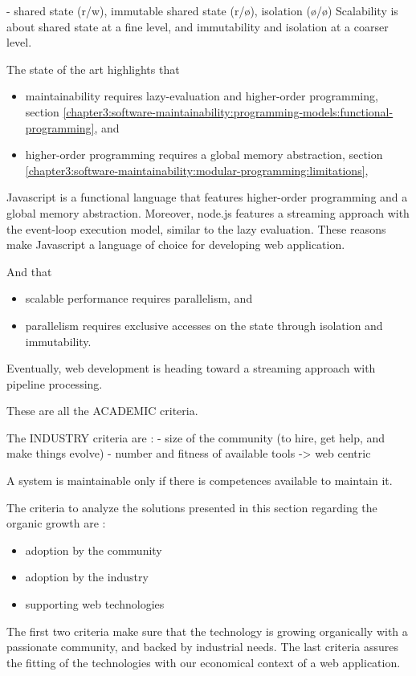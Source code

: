 - shared state (r/w), immutable shared state (r/ø), isolation (ø/ø)
Scalability is about shared state at a fine level, and immutability and isolation at a coarser level.


The state of the art highlights that
\begin{itemize}
\item maintainability requires lazy-evaluation and higher-order programming, section \ref{chapter3:software-maintainability:programming-models:functional-programming}, and
\item higher-order programming requires a global memory abstraction, section \ref{chapter3:software-maintainability:modular-programming:limitations},
\end{itemize}
Javascript is a functional language that features higher-order programming and a global memory abstraction.
Moreover, node.js features a streaming approach with the event-loop execution model, similar to the lazy evaluation.
These reasons make Javascript a language of choice for developing web application.

And that
\begin{itemize}
\item scalable performance requires parallelism, and
\item parallelism requires exclusive accesses on the state through isolation and immutability.
\end{itemize}
Eventually, web development is heading toward a streaming approach with pipeline processing.




These are all the ACADEMIC criteria.

The INDUSTRY criteria are :
- size of the community (to hire, get help, and make things evolve)
- number and fitness of available tools
  ->  web centric


A system is maintainable only if there is competences available to maintain it.

The criteria to analyze the solutions presented in this section regarding the organic growth are : 
\begin{itemize}
\item adoption by the community
\item adoption by the industry
\item supporting web technologies
\end{itemize}
The first two criteria make sure that the technology is growing organically with a passionate community, and backed by industrial needs.
The last criteria assures the fitting of the technologies with our economical context of a web application. 




